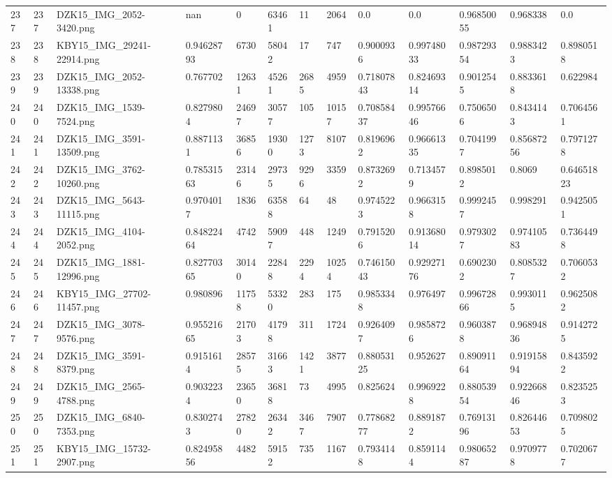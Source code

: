 \documentclass[11pt, a4paper, twoside]{report}
\begin{document}
\begin{longtable}[c]{@{}lllllllllllll@{}}
237 & 237 & DZK15\_IMG\_2052-3420.png & nan & 0 & 63461 & 11 & 2064 & 0.0 & 0.0 & 0.96850055 & 0.968338 & 0.0 \\
238 & 238 & KBY15\_IMG\_29241-22914.png & 0.94628793 & 6730 & 58042 & 17 & 747 & 0.9000936 & 0.99748033 & 0.98729354 & 0.9883423 & 0.8980518 \\
239 & 239 & DZK15\_IMG\_2052-13338.png & 0.767702 & 12631 & 45261 & 2685 & 4959 & 0.71807843 & 0.82469314 & 0.9012545 & 0.8833618 & 0.622984 \\
240 & 240 & DZK15\_IMG\_1539-7524.png & 0.8279804 & 24697 & 30577 & 105 & 10157 & 0.70858437 & 0.99576646 & 0.7506506 & 0.8434143 & 0.7064561 \\
241 & 241 & DZK15\_IMG\_3591-13509.png & 0.8871131 & 36856 & 19300 & 1273 & 8107 & 0.8196962 & 0.96661335 & 0.7041997 & 0.85687256 & 0.7971278 \\
242 & 242 & DZK15\_IMG\_3762-10260.png & 0.78531563 & 23146 & 29735 & 9296 & 3359 & 0.8732692 & 0.7134579 & 0.8985012 & 0.8069 & 0.64651823 \\
243 & 243 & DZK15\_IMG\_5643-11115.png & 0.9704017 & 1836 & 63588 & 64 & 48 & 0.9745223 & 0.9663158 & 0.9992457 & 0.998291 & 0.9425051 \\
244 & 244 & DZK15\_IMG\_4104-2052.png & 0.84822464 & 4742 & 59097 & 448 & 1249 & 0.7915206 & 0.91368014 & 0.9793027 & 0.97410583 & 0.7364498 \\
245 & 245 & DZK15\_IMG\_1881-12996.png & 0.82770365 & 30140 & 22848 & 2294 & 10254 & 0.74615043 & 0.92927176 & 0.6902302 & 0.8085327 & 0.7060532 \\
246 & 246 & KBY15\_IMG\_27702-11457.png & 0.980896 & 11758 & 53320 & 283 & 175 & 0.9853348 & 0.976497 & 0.99672866 & 0.9930115 & 0.9625082 \\
247 & 247 & DZK15\_IMG\_3078-9576.png & 0.95521665 & 21703 & 41798 & 311 & 1724 & 0.9264097 & 0.9858726 & 0.9603878 & 0.96894836 & 0.9142725 \\
248 & 248 & DZK15\_IMG\_3591-8379.png & 0.9151614 & 28575 & 31663 & 1421 & 3877 & 0.88053125 & 0.952627 & 0.89091164 & 0.91915894 & 0.8435922 \\
249 & 249 & DZK15\_IMG\_2565-4788.png & 0.9032234 & 23650 & 36818 & 73 & 4995 & 0.825624 & 0.9969228 & 0.88053954 & 0.92266846 & 0.8235253 \\
250 & 250 & DZK15\_IMG\_6840-7353.png & 0.8302743 & 27820 & 26342 & 3467 & 7907 & 0.77868277 & 0.8891872 & 0.76913196 & 0.82644653 & 0.7098025 \\
251 & 251 & KBY15\_IMG\_15732-2907.png & 0.82495856 & 4482 & 59152 & 735 & 1167 & 0.7934148 & 0.8591144 & 0.98065287 & 0.9709778 & 0.7020677 \\

\end{longtable}
\end{document}
